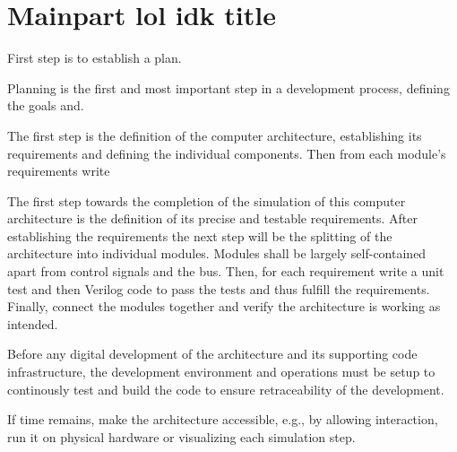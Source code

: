 \chapter{Mainpart lol idk title}

First step is to establish a plan. 

Planning is the first and most important step in a development process, defining the goals and.

The first step is the definition of the computer architecture, establishing its requirements and defining the individual components. Then from each module's requirements write

The first step towards the completion of the simulation of this computer architecture is the definition of its precise and testable requirements. After establishing the requirements the next step will be the splitting of the architecture into individual modules. Modules shall be largely self-contained apart from control signals and the bus. Then, for each requirement write a unit test and then Verilog code to pass the tests and thus fulfill the requirements. Finally, connect the modules together and verify the architecture is working as intended. 

Before any digital development of the architecture and its supporting code infrastructure, the development environment and operations must be setup to continously test and build the code to ensure retraceability of the development.

If time remains, make the architecture accessible, e.g., by allowing interaction, run it on physical hardware or visualizing each simulation step.

 




